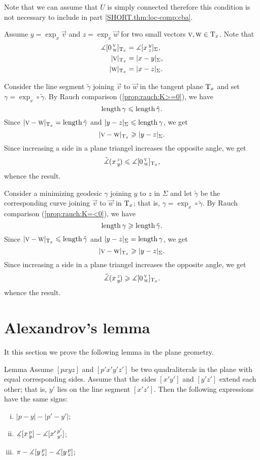 Note that we can assume that $U$ is simply connected therefore this condition is not necessary to include in part \ref{SHORT.thm:loc-comp:cba}.

Assume $y=\exp_x\vec v$ and $z=\exp_x\vec w$ for two small vectors $\textsc v,\textsc w\in\mathrm{T}_x$.
Note that 
\begin{align*}
\measuredangle [0\,{}^{\textsc v}_{\textsc w}]_{\mathrm{T}_x}&=\measuredangle [x\,{}^{y}_{z}]_\Sigma,
\\
|\textsc v|_{\mathrm{T}_x}&=|x-y|_\Sigma, 
\\
|\textsc w|_{\mathrm{T}_x}&=|x-z|_\Sigma.
\end{align*}

Consider the line segment $\tilde \gamma$ joining $\vec v$ to $\vec w$ in the tangent plane $\mathrm{T}_x$ and set $\gamma=\exp_x\circ\tilde \gamma$.
By Rauch comparison (\ref{prop:rauch:K>=0}), we have
\[\mathop{\rm length}\nolimits\gamma\leqslant \mathop{\rm length}\nolimits \tilde \gamma.\]
Since $|\textsc v-\textsc w|_{\mathrm{T}_x}=\mathop{\rm length}\nolimits\tilde \gamma$ and $|y-z|_{\Sigma}\leqslant \mathop{\rm length}\nolimits\gamma$, we get 
\[|\textsc v-\textsc w|_{\mathrm{T}_x}\geqslant |y-z|_\Sigma.\]
Since increasing a side in a plane triangel increases the opposite angle, we get
\[\tilde\measuredangle(x\,{}^{z}_{y}\hspace{-0.2ex})\leqslant\measuredangle [0\,{}^{\textsc v}_{\textsc w}]_{\mathrm{T}_x},\]
whence the result.

Consider a minimizing geodesic $\gamma$ joining $y$ to $z$ in $\Sigma$ and let $\tilde \gamma$ be the corresponding curve joining $\vec v$ to $\vec w$ in $\mathrm{T}_x$; that is,  $\gamma=\exp_x\circ\tilde \gamma$.
By Rauch comparison (\ref{prop:rauch:K=<0}), we have
\[\mathop{\rm length}\nolimits\gamma\geqslant \mathop{\rm length}\nolimits \tilde \gamma.\]
Since $|\textsc v-\textsc w|_{\mathrm{T}_x}\leqslant\mathop{\rm length}\nolimits\tilde \gamma$ and $|y-z|_{\Sigma}= \mathop{\rm length}\nolimits\gamma$, we get 
\[|\textsc v-\textsc w|_{\mathrm{T}_x}\geqslant |y-z|_\Sigma.\]
Since increasing a side in a plane triangel increases the opposite angle, we get
\[\tilde\measuredangle(x\,{}^{z}_{y}\hspace{-0.2ex})\geqslant\measuredangle [0\,{}^{\textsc v}_{\textsc w}]_{\mathrm{T}_x}.\]
whence the result.
\qedsf

\section{Alexandrov's lemma}

It this section we prove the following lemma in the plane geometry.

\begin{thm}{Lemma}
\label{lem:alex}
Assume $[pxyz]$ and $[p'x'y'z']$ be two quadraliterals in the plane with equal corresponding sides.
Assume that the sides $[x'y']$ and $[y'z']$ extend each other; that is, $y'$ lies on the line segment $[x'z']$.
Then the following expressions have the same signs:
\begin{enumerate}[(i)]
 \item $|p-y|-|p'-y'|$;
 \item $\measuredangle[x\,{}^{p}_{y}]-\measuredangle[x'\,{}^{p'}_{y'}]$;
 \item $\pi-\measuredangle[y\,{}^{p}_{x}]-\measuredangle[y\,{}^{p}_{z}]$;
\end{enumerate}
\end{thm}

